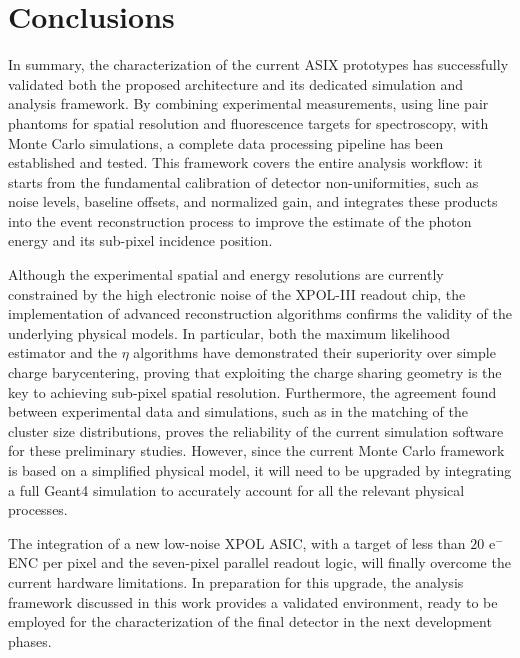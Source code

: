 \section{Conclusions}
In summary, the characterization of the current ASIX prototypes has successfully validated both the proposed architecture and its dedicated simulation and analysis framework. By combining experimental measurements, using line pair phantoms for spatial resolution and fluorescence targets for spectroscopy, with Monte Carlo simulations, a complete data processing pipeline has been established and tested. This framework covers the entire analysis workflow: it starts from the fundamental calibration of detector non-uniformities, such as noise levels, baseline offsets, and normalized gain, and integrates these products into the event reconstruction process to improve the estimate of the photon energy and its sub-pixel incidence position.

Although the experimental spatial and energy resolutions are currently constrained by the high electronic noise of the XPOL-III readout chip, the implementation of advanced reconstruction algorithms confirms the validity of the underlying physical models. In particular, both the maximum likelihood estimator and the $\eta$ algorithms have demonstrated their superiority over simple charge barycentering, proving that exploiting the charge sharing geometry is the key to achieving sub-pixel spatial resolution. Furthermore, the agreement found between experimental data and simulations, such as in the matching of the cluster size distributions, proves the reliability of the current simulation software for these preliminary studies. However, since the current Monte Carlo framework is based on a simplified physical model, it will need to be upgraded by integrating a full Geant4 simulation to accurately account for all the relevant physical processes.

The integration of a new low-noise XPOL ASIC, with a target of less than $20\text{ e}^-$ ENC per pixel and the seven-pixel parallel readout logic, will finally overcome the current hardware limitations. In preparation for this upgrade, the analysis framework discussed in this work provides a validated environment, ready to be employed for the characterization of the final detector in the next development phases.
